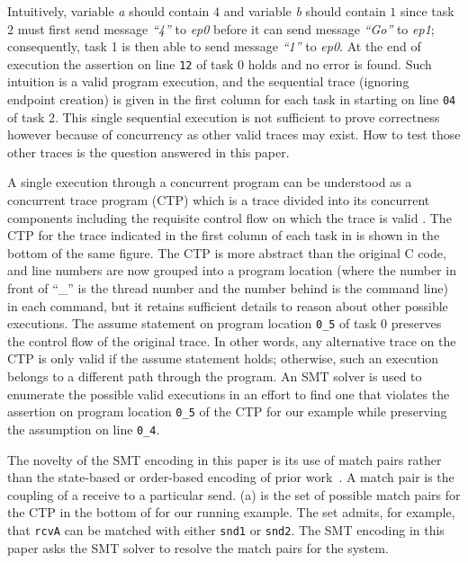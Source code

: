 Intuitively, variable \textit{a} should contain $4$ and variable
\textit{b} should contain $1$ since task 2 must first send message \textit{``4''}
to \textit{ep0} before it can send message \textit{``Go''} to \textit{ep1};
consequently, task 1 is then able to send message \textit{``1''} to
\textit{ep0}. At the end of execution the assertion on line \texttt{12}
of task 0 holds and no error is found. Such intuition is a valid
program execution, and the sequential trace (ignoring endpoint creation)
is given in the first column for each
task in  starting on line \texttt{04} of task 2. This single sequential execution is not sufficient to prove correctness
however because of concurrency as other valid traces may exist. How
to test those other traces is the question answered in this paper.

A single execution through a concurrent program can be understood as a
concurrent trace program (CTP) which is a trace divided into its
concurrent components including the requisite control flow on which
the trace is valid \cite{wang:fse09}. The CTP for the trace indicated
in the first column of each task in  is shown in
the bottom of the same figure. The CTP is more abstract than the
original C code, and line numbers are now grouped into a program location
(where the number in front of ``\_'' is the thread number and the number behind is the command line)
in each command, but it retains sufficient details to reason about
other possible executions. The assume statement on program location \texttt{0\_5}
of task 0 preserves the control flow of the original trace. In other
words, any alternative trace on the CTP is only valid if the assume
statement holds; otherwise, such an execution belongs to a different
path through the program. An SMT solver is used to enumerate the
possible valid executions in an effort to find one that violates the
assertion on program location \texttt{0\_5} of the CTP for our example while preserving the assumption on line \texttt{0\_4}.

The novelty of the SMT encoding in this paper is its use of match
pairs rather than the state-based or order-based encoding of prior work~\cite{elwakil:padtad10,elwakil:atva10}. A match pair is the coupling of a receive to a particular send.
(a) is the set of possible match pairs for the CTP in
the bottom of  for our running example. The set
admits, for example, that \texttt{rcvA} can be matched with either
\texttt{snd1} or \texttt{snd2}. The SMT encoding in this paper asks
the SMT solver to resolve the match pairs for the system.

